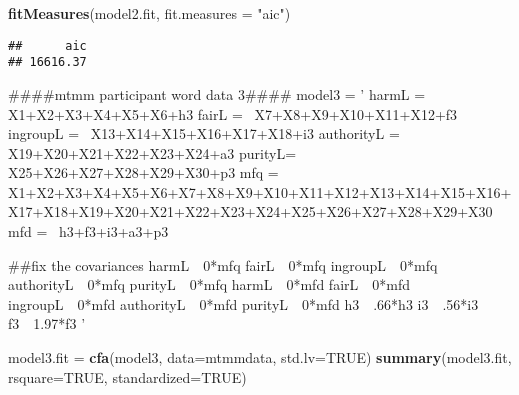 \documentclass[english,man]{apa6}
\newenvironment{Shaded}{\begin{snugshade}}{\end{snugshade}}
\newcommand{\KeywordTok}[1]{\textcolor[rgb]{0.13,0.29,0.53}{\textbf{#1}}}
\newcommand{\DataTypeTok}[1]{\textcolor[rgb]{0.13,0.29,0.53}{#1}}
\newcommand{\StringTok}[1]{\textcolor[rgb]{0.31,0.60,0.02}{#1}}
\newcommand{\OtherTok}[1]{\textcolor[rgb]{0.56,0.35,0.01}{#1}}
\newcommand{\NormalTok}[1]{#1}
\newcounter{author}
\theoremstyle{definition}
\theoremstyle{definition}
\theoremstyle{definition}
\theoremstyle{remark}
\begin{document}
\begin{Shaded}
\begin{Highlighting}[]
\KeywordTok{fitMeasures}\NormalTok{(model2.fit, }\DataTypeTok{fit.measures =} \StringTok{"aic"}\NormalTok{)}
\end{Highlighting}
\end{Shaded}

\begin{verbatim}
##      aic 
## 16616.37
\end{verbatim}

\begin{Shaded}
\begin{Highlighting}[]
\NormalTok{####mtmm participant word data 3####}
\NormalTok{model3 =}\StringTok{ '}
\StringTok{harmL =~ X1+X2+X3+X4+X5+X6+h3}
\StringTok{fairL =~ X7+X8+X9+X10+X11+X12+f3}
\StringTok{ingroupL =~ X13+X14+X15+X16+X17+X18+i3}
\StringTok{authorityL =~ X19+X20+X21+X22+X23+X24+a3}
\StringTok{purityL=~ X25+X26+X27+X28+X29+X30+p3}
\StringTok{mfq =~ X1+X2+X3+X4+X5+X6+X7+X8+X9+X10+X11+X12+X13+X14+X15+X16+X17+X18+X19+X20+X21+X22+X23+X24+X25+X26+X27+X28+X29+X30}
\StringTok{mfd =~ h3+f3+i3+a3+p3}

\StringTok{##fix the covariances}
\StringTok{harmL~~0*mfq}
\StringTok{fairL~~0*mfq}
\StringTok{ingroupL~~0*mfq}
\StringTok{authorityL~~0*mfq}
\StringTok{purityL~~0*mfq}
\StringTok{harmL~~0*mfd}
\StringTok{fairL~~0*mfd}
\StringTok{ingroupL~~0*mfd}
\StringTok{authorityL~~0*mfd}
\StringTok{purityL~~0*mfd}
\StringTok{h3~~.66*h3}
\StringTok{i3~~.56*i3}
\StringTok{f3~~1.97*f3}
\StringTok{'}

\NormalTok{model3.fit =}\StringTok{ }\KeywordTok{cfa}\NormalTok{(model3, }\DataTypeTok{data=}\NormalTok{mtmmdata, }\DataTypeTok{std.lv=}\OtherTok{TRUE}\NormalTok{)}
\KeywordTok{summary}\NormalTok{(model3.fit, }\DataTypeTok{rsquare=}\OtherTok{TRUE}\NormalTok{, }\DataTypeTok{standardized=}\OtherTok{TRUE}\NormalTok{)}
\end{Highlighting}
\end{Shaded}
\end{document}
